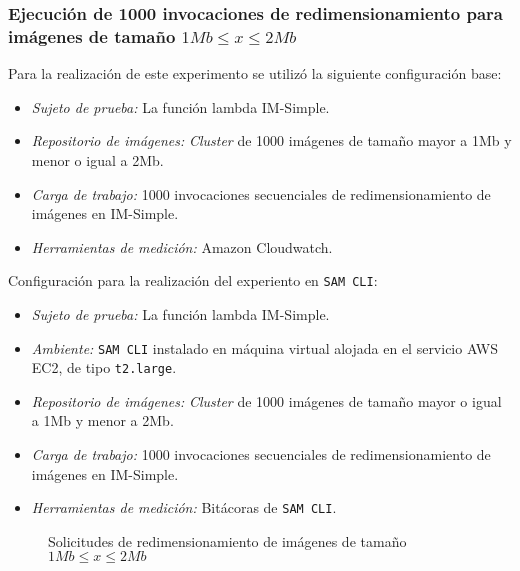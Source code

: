 \subsubsection{Ejecución de 1000 invocaciones de redimensionamiento para imágenes de tamaño $1Mb \leq x \leq 2Mb$}

Para la realización de este experimento se utilizó la siguiente configuración base:
\begin{itemize}
    \item \emph{Sujeto de prueba:} La función lambda IM-Simple.
    \item \emph{Repositorio de imágenes:} \emph{Cluster} de 1000 imágenes de tamaño mayor a 1Mb y menor o igual a 2Mb.
    \item \emph{Carga de trabajo:} 1000 invocaciones secuenciales de redimensionamiento de imágenes en IM-Simple.
    \item \emph{Herramientas de medición:} Amazon Cloudwatch.
\end{itemize}

Configuración para la realización del experiento en \texttt{SAM CLI}:
\begin{itemize}
    \item \emph{Sujeto de prueba:} La función lambda IM-Simple.
    \item \emph{Ambiente:} \texttt{SAM CLI} instalado en máquina virtual alojada en el servicio AWS EC2, de tipo \texttt{t2.large}.
    \item \emph{Repositorio de imágenes:} \emph{Cluster} de 1000 imágenes de tamaño mayor o igual a 1Mb y menor a 2Mb.
    \item \emph{Carga de trabajo:} 1000 invocaciones secuenciales de redimensionamiento de imágenes en IM-Simple.
    \item \emph{Herramientas de medición:} Bitácoras de \texttt{SAM CLI}.
\end{itemize}

\begin{figure}
\hspace{-1cm}
\caption{Solicitudes de redimensionamiento de imágenes de tamaño $1Mb \leq x \leq 2Mb$}
\label{fig:comparacion-sam-2mb}
\end{figure}

